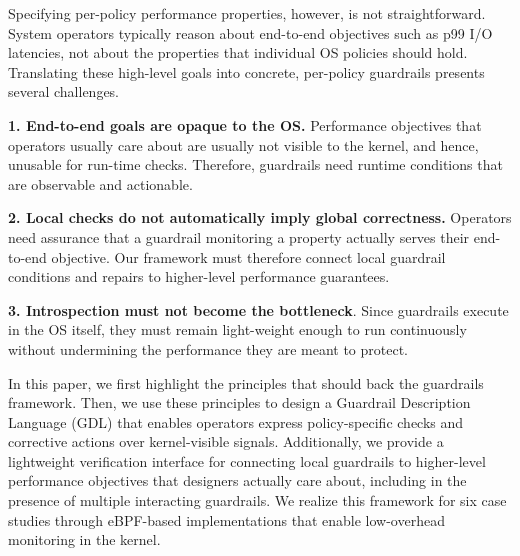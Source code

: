 Specifying per-policy performance properties, however, is not straightforward. System operators typically reason about end-to-end objectives such as p99 I/O latencies, not about the properties that individual OS policies should hold. Translating these high-level goals into concrete, per-policy guardrails presents several challenges. 

\noindent\textbf{1. End-to-end goals are opaque to the OS.} Performance objectives that operators usually care about are usually not visible to the kernel, and hence, unusable for run-time checks. Therefore, guardrails need runtime conditions that are observable and actionable.

\noindent\textbf{2. Local checks do not automatically imply global correctness.} Operators need assurance that a guardrail monitoring a property actually serves their end-to-end objective. Our framework must therefore connect local guardrail conditions and repairs to higher-level performance guarantees.

\noindent\textbf{3. Introspection must not become the bottleneck}. Since guardrails execute in the OS itself, they must remain light-weight enough to run continuously without undermining the performance they are meant to protect.

In this paper, we first highlight the principles that should back the guardrails framework. Then, we use these principles to design a Guardrail Description Language (GDL) that enables operators express policy-specific checks and corrective actions over kernel-visible signals.
Additionally, we provide a lightweight verification interface for connecting local guardrails to higher-level performance objectives that designers actually care about, including in the presence of multiple interacting guardrails. We realize this framework for six case studies through eBPF-based implementations that enable low-overhead monitoring in the kernel.



